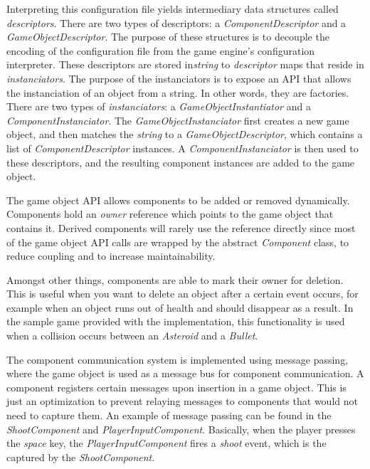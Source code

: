 \documentclass[
    phd,
    electronic,
    letterpaper,
    simplechapterheading,
    openany,
    parttop,
    lof,
]{byumsphd}
\begin{document}
Interpreting this configuration file yields intermediary data structures called \textit{descriptors}. There are two types of descriptors: a \textit{ComponentDescriptor} and a \textit{GameObjectDescriptor}. The purpose of these structures is to decouple the encoding of the configuration file from the game engine's configuration interpreter. These descriptors are stored in\textit{string} to \textit{descriptor} maps that reside in \textit{instanciators}. The purpose of the instanciators is to expose an API that allows the instanciation of an object from a string. In other words, they are factories. There are two types of \textit{instanciators}: a \textit{GameObjectInstantiator} and a \textit{ComponentInstanciator}. The \textit{GameObjectInstanciator} first creates a new game object, and then matches the \textit{string} to a \textit{GameObjectDescriptor}, which contains a list of \textit{ComponentDescriptor} instances. A \textit{ComponentInstanciator} is then used to these descriptors, and the resulting component instances are added to the game object.

The game object API allows components to be added or removed dynamically. Components hold an \textit{owner} reference which points to the game object that contains it. Derived components will rarely use the reference directly since most of the game object API calls are wrapped by the abstract \textit{Component} class, to reduce coupling and to increase maintainability.

Amongst other things, components are able to mark their owner for deletion. This is useful when you want to delete an object after a certain event occurs, for example when an object runs out of health and should disappear as a result. In the sample game provided with the implementation, this functionality is used when a collision occurs between an \textit{Asteroid} and a \textit{Bullet}.

The component communication system is implemented using message passing, where the game object is used as a message bus for component communication. A component registers certain messages upon insertion in a game object. This is just an optimization to prevent relaying messages to components that would not need to capture them. An example of message passing can be found in the \textit{ShootComponent} and \textit{PlayerInputComponent}. Basically, when the player presses the \textit{space} key, the \textit{PlayerInputComponent} fires a \textit{shoot} event, which is the captured by the \textit{ShootComponent}.
\end{document}
